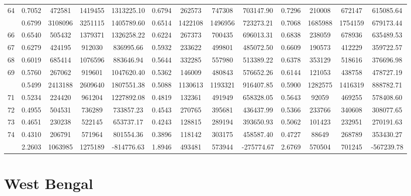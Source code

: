 \documentclass[
  12pt,
]{article}
\begin{document}
\begin{longtable}[t]{lcccccccccccc}
64 & 0.7052 & 472581 & 1419455 & 1313225.10 & 0.6794 & 262573 & 747308 & 703147.90 & 0.7296 & 210008 & 672147 & 615085.64\\
\addlinespace
65 & 0.6799 & 3108096 & 3251115 & 1405789.60 & 0.6514 & 1422108 & 1496956 & 723273.21 & 0.7068 & 1685988 & 1754159 & 679173.44\\
66 & 0.6540 & 505432 & 1379371 & 1326258.22 & 0.6224 & 267373 & 700435 & 696013.31 & 0.6838 & 238059 & 678936 & 635489.53\\
67 & 0.6279 & 424195 & 912030 & 836995.66 & 0.5932 & 233622 & 499801 & 485072.50 & 0.6609 & 190573 & 412229 & 359722.57\\
68 & 0.6019 & 685414 & 1076596 & 883646.94 & 0.5644 & 332285 & 557980 & 513389.22 & 0.6378 & 353129 & 518616 & 376696.98\\
69 & 0.5760 & 267062 & 919601 & 1047620.40 & 0.5362 & 146009 & 480843 & 576652.26 & 0.6144 & 121053 & 438758 & 478727.19\\
\addlinespace
70 & 0.5499 & 2413188 & 2609640 & 1807551.38 & 0.5088 & 1130613 & 1193321 & 916407.85 & 0.5900 & 1282575 & 1416319 & 888782.71\\
71 & 0.5234 & 224420 & 961204 & 1227892.08 & 0.4819 & 132361 & 491949 & 658328.05 & 0.5643 & 92059 & 469255 & 578408.60\\
72 & 0.4955 & 504531 & 736289 & 733857.23 & 0.4543 & 270765 & 395681 & 436437.99 & 0.5366 & 233766 & 340608 & 308077.65\\
73 & 0.4651 & 230238 & 522145 & 653737.17 & 0.4243 & 128815 & 289194 & 393650.93 & 0.5062 & 101423 & 232951 & 270191.63\\
74 & 0.4310 & 206791 & 571964 & 801554.36 & 0.3896 & 118142 & 303175 & 458587.40 & 0.4727 & 88649 & 268789 & 353430.27\\
\addlinespace
75 & 2.2603 & 1063985 & 1275189 & -814776.63 & 1.8946 & 493481 & 573944 & -275774.67 & 2.6769 & 570504 & 701245 & -567239.78\\*
\end{longtable}
\endgroup{}

\pagebreak

\hypertarget{west-bengal}{%
\section{West Bengal}\label{west-bengal}}

\begingroup\fontsize{9.7}{11.7}\selectfont
\end{document}
